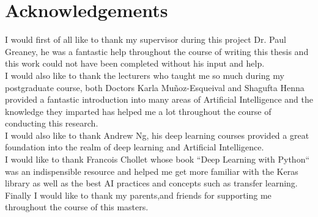 \chapter*{Acknowledgements}
I would first of all like to thank my supervisor during this project Dr. Paul Greaney, he was a fantastic help throughout the course of writing this thesis and this work could not have been completed without his input and help.
\\[1.5cm]
I would also like to thank the lecturers who taught me so much during my postgraduate course, both Doctors Karla Muñoz-Esqueival and Shagufta Henna provided a fantastic introduction into many areas of Artificial Intelligence and the knowledge they imparted has helped me a lot throughout the course of conducting this research. 
\\[1.5cm]
I would also like to thank Andrew Ng, his deep learning courses provided a great foundation into the realm of deep learning and Artificial Intelligence.
\\[1.5cm]
I would like to thank Francois Chollet whose book ``Deep Learning with Python`` was an indispensible resource and helped me get more familiar with the Keras library as well as the best AI practices and concepts such as transfer learning.
\\[1.5cm]
Finally I would like to thank my parents,and friends for supporting me throughout the course of this masters.